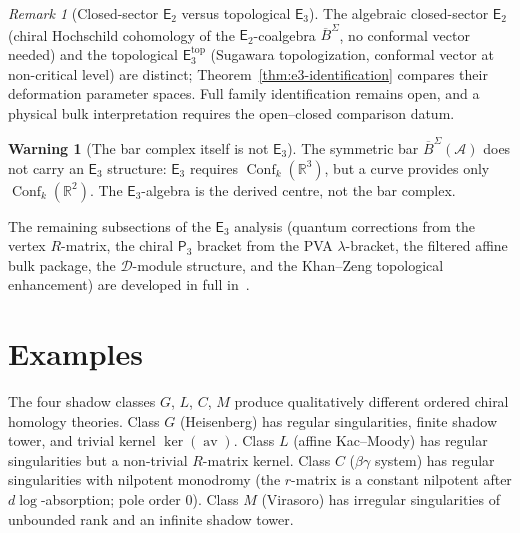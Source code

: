\documentclass[11pt,reqno]{amsart}
\theoremstyle{definition}
\newtheorem{warning}[theorem]{Warning}
\theoremstyle{remark}
\newtheorem{remark}[theorem]{Remark}
\newcommand{\cA}{\mathcal{A}}
\newcommand{\cD}{\mathcal{D}}
\newcommand{\Etwo}{\mathsf{E}_{2}}
\providecommand{\Ethree}{\mathsf{E}_{3}}
\newcommand{\Pthree}{\mathsf{P}_{3}}
\DeclareMathOperator{\Conf}{Conf}
\DeclareMathOperator{\av}{av}
\newcommand{\BarSig}{\overline{B}^{\Sigma}}
\newcommand{\RR}{\mathbb{R}}
\numberwithin{equation}{section}
\begin{document}
\begin{remark}[Closed-sector $\Etwo$ versus topological $\Ethree$]
\label{rem:two-e3}
The algebraic closed-sector $\Etwo$ (chiral Hochschild cohomology of
the $\Etwo$-coalgebra $\BarSig$, no conformal vector needed) and the
topological $\Ethree^{\mathrm{top}}$ (Sugawara
topologization, conformal vector at non-critical level)
are distinct; Theorem~\ref{thm:e3-identification}
compares their deformation parameter spaces. Full family
identification remains open, and a physical bulk interpretation
requires the open--closed comparison datum.
\end{remark}

\begin{warning}[The bar complex itself is not $\Ethree$]
\label{warn:bar-not-e3}
The symmetric bar $\BarSig(\cA)$ does not carry an
$\Ethree$ structure: $\Ethree$ requires
$\Conf_k(\RR^3)$, but a curve provides only
$\Conf_k(\RR^2)$. The $\Ethree$-algebra is the derived
centre, not the bar complex.
\end{warning}

\noindent The remaining subsections of the $\Ethree$ analysis
(quantum corrections from the vertex $R$-matrix, the chiral
$\Pthree$ bracket from the PVA $\lambda$-bracket, the
filtered affine bulk package, the $\cD$-module structure, and
the Khan--Zeng topological enhancement) are developed in full
in~\cite[\S IV.3--IV.7]{Lorgat26I}.


\section{Examples}
\label{sec:examples}

The four shadow classes $G$, $L$, $C$, $M$ produce
qualitatively different ordered chiral homology theories.
Class $G$ (Heisenberg) has regular singularities, finite
shadow tower, and trivial kernel $\ker(\av)$. Class $L$
(affine Kac--Moody) has regular singularities but a
non-trivial $R$-matrix kernel. Class $C$
($\beta\gamma$ system) has regular singularities with
nilpotent monodromy (the $r$-matrix is a constant nilpotent
after $d\log$-absorption; pole order $0$). Class $M$ (Virasoro) has irregular
singularities of unbounded rank and an infinite shadow tower.
\end{document}
